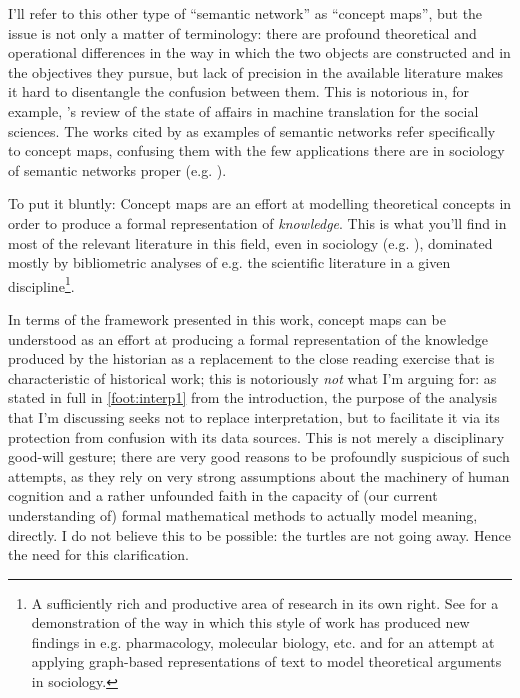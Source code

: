 I'll refer to this other type of ``semantic network'' as ``concept maps'', but the issue is not only a matter of terminology: there are profound theoretical and operational differences in the way in which the two objects are constructed and in the objectives they pursue, but lack of precision in the available literature makes it hard to disentangle the confusion between them.
This is notorious in, for example, \citet{evans2016}'s review of the state of affairs in machine translation for the social sciences.
The works cited by \citeauthor{evans2016} as examples of semantic networks \citep{carley1993,carley1993a} refer specifically to concept maps, confusing them with the few applications there are in sociology of semantic networks proper (e.g. \citet{rule2015}).

To put it bluntly: Concept maps are an effort at modelling theoretical concepts in order to produce a formal representation of \emph{knowledge}.
This is what you'll find in most of the relevant literature in this field, even in sociology (e.g. \citet{lee2015}), dominated mostly by bibliometric analyses of e.g. the scientific literature in a given discipline\footnote{
    A sufficiently rich and productive area of research in its own right.
    See \citet{cohen2010} for a demonstration of the way in which this style of work has produced new findings in e.g. pharmacology, molecular biology, etc. and \citet{lee2015} for an attempt at applying graph-based representations of text to model theoretical arguments in sociology.
}.

In terms of the framework presented in this work, concept maps can be understood as an effort at producing a formal representation of the knowledge produced by the historian as a replacement to the close reading exercise that is characteristic of historical work; this is notoriously \emph{not} what I'm arguing for: as stated in full in \autoref{foot:interp1} from the introduction, the purpose of the analysis that I'm discussing seeks not to replace interpretation, but to facilitate it via its protection from confusion with its data sources.
This is not merely a disciplinary good-will gesture; there are very good reasons to be profoundly suspicious of such attempts, as they rely on very strong assumptions about the machinery of human cognition and a rather unfounded faith in the capacity of (our current understanding of) formal mathematical methods to actually model meaning, directly.
I do not believe this to be possible: the turtles are not going away.
Hence the need for this clarification.

